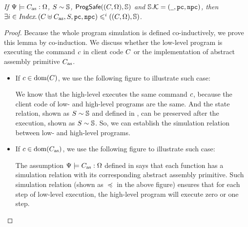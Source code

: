 {\begin{lemma}
    \label{lemma:function sim implies whole program sim}
    \em
    If ${\Psi} \models {C_{\text{as}}} : {\Omega}$, 
    ${S} \sim {\mathbb{S}}$, 
    $\textsf{ProgSafe}((C, \Omega), \mathbb{S})$ and 
    $\mathbb{S}.\mathcal{K} = (\underline{\ \,}, \texttt{pc}, \texttt{npc})$, 
    then 
    $\exists i \in \textit{Index}. \, 
    (C\uplus C_{\text{as}}, S, \texttt{pc}, \texttt{npc})
    \leqslant^{i} ((C, \Omega), \mathbb{S})$.  
\end{lemma}
\begin{proof}
    Because the whole program simulation is defined 
    co-inductively, we prove this lemma by co-induction. 
    We discuss whether the low-level program 
    is executing the command $c$ in client code 
    $C$ or the implementation of 
    abstract assembly primitive $C_{\text{as}}$. 
    \begin{itemize}
        \item If $c \in \text{dom}(C)$, we use the 
            following figure to illustrate such case:
            \begin{center}
                \vspace*{-0.5em}
                
                \vspace*{-0.5em}
            \end{center} 
            We know that the high-level executes the same command 
            $c$, because the client code of low- and 
            high-level programs are the same.  
            And the state relation, shown as ${S} \sim {\mathbb{S}}$
            and defined in \Sec{\ref{subsec:correctness-primitive}}, 
            can be preserved after the execution, shown 
            as ${S} \sim {\mathbb{S}}$. So, we can 
            establish the simulation relation between 
            low- and high-level programs.  
        
        \item If $c \in \text{dom}(C_{\text{as}})$, we use the 
            following figure to illustrate such case:
            \begin{center}
                \vspace*{-0.5em}
                
                \vspace*{-0.5em}
            \end{center}
            The assumption ${\Psi} \models {C_{\text{as}}} : {\Omega}$ 
            defined in \Def{\ref{def:wdprim-sem}} says that 
            each \sparc{} function has a simulation relation 
            with its corresponding abstract assembly primitive. 
            Such simulation relation 
            (shown as $\preccurlyeq$ in the above figure)
            ensures that for each step 
            of low-level execution, the high-level program will 
            execute zero or one step.
    \end{itemize} 


\end{proof}}
